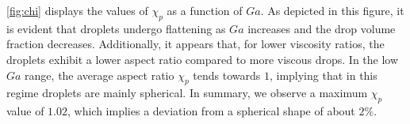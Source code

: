 \ref{fig:chi} displays the values of $\chi_p$ as a function of $Ga$.
As depicted in this figure, it is evident that droplets undergo flattening as $Ga$ increases and the drop volume fraction decreases. 
Additionally, it appears that, for lower viscosity ratios, the droplets exhibit a lower aspect ratio compared to more viscous drops.
In the low $Ga$ range, the average aspect ratio $\chi_p$ tends towards $1$, implying that in this regime droplets are mainly spherical. 
In summary, we observe a maximum $\chi_p$ value of $1.02$, which implies a deviation from a spherical shape of about $2\%$.



